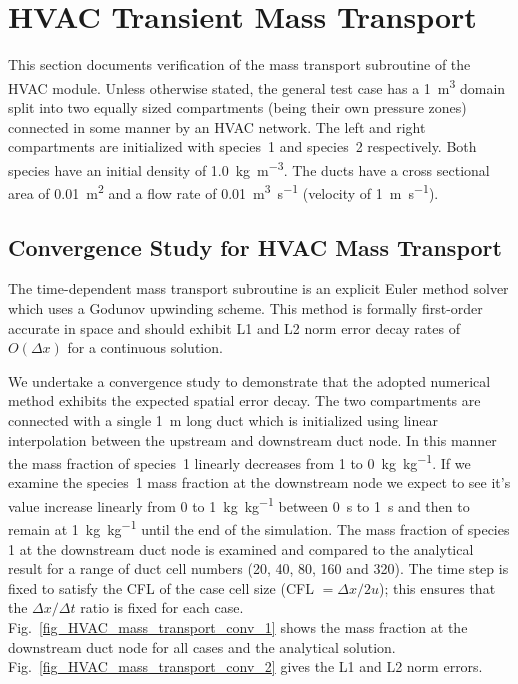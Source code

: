 \documentclass[11pt]{book}
\begin{document}
\section{HVAC Transient Mass Transport}

This section documents verification of the mass transport subroutine of the HVAC module. Unless otherwise stated, the general test case has a \SI{1}{\meter\cubed} domain split into two equally sized compartments (being their own pressure zones) connected in some manner by an HVAC network. The left and right compartments are initialized with species~1 and species~2 respectively. Both species have an initial density of \SI[per-mode=symbol]{1.0}{\kilogram\per\meter\cubed}. The ducts have a cross sectional area of \SI{0.01}{m^2} and a flow rate of \SI[per-mode=symbol]{0.01}{\meter\cubed\per\second} (velocity of \SI[per-mode=symbol]{1}{\meter\per\second}).

\subsection{Convergence Study for HVAC Mass Transport}
\label{HVAC_mass_transport_conv_0020}
\label{HVAC_mass_transport_conv_0040}
\label{HVAC_mass_transport_conv_0080}
\label{HVAC_mass_transport_conv_0160}
\label{HVAC_mass_transport_conv_0320}
The time-dependent mass transport subroutine is an explicit Euler method solver which uses a Godunov upwinding scheme. This method is formally first-order accurate in space and should exhibit L1 and L2 norm error decay rates of $O(\Delta x)$ for a continuous solution.

We undertake a convergence study to demonstrate that the adopted numerical method exhibits the expected spatial error decay. The two compartments are connected with a single \SI{1}{\meter} long duct which is initialized using linear interpolation between the upstream and downstream duct node. In this manner the mass fraction of species~1 linearly decreases from \num{1} to \SI[per-mode=symbol]{0}{\kilogram\per\kilogram}. If we examine the species~1 mass fraction at the downstream node we expect to see it's value increase linearly from \num{0} to \SI[per-mode=symbol]{1}{\kilogram\per\kilogram} between \SI{0}{\second} to \SI{1}{\second} and then to remain at \SI[per-mode=symbol]{1}{\kilogram\per\kilogram} until the end of the simulation. The mass fraction of species 1 at the downstream duct node is examined and compared to the analytical result for a range of duct cell numbers (20, 40, 80, 160 and 320). The time step is fixed to satisfy the CFL of the case cell size (CFL $= \Delta x/2u$); this ensures that the $\Delta x/\Delta t$ ratio is fixed for each case. Fig.~\ref{fig_HVAC_mass_transport_conv_1} shows the mass fraction at the downstream duct node for all cases and the analytical solution. Fig.~\ref{fig_HVAC_mass_transport_conv_2} gives the L1 and L2 norm errors.
\end{document}
